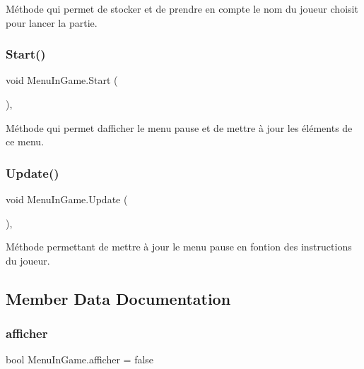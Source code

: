 Méthode qui permet de stocker et de prendre en compte le nom du joueur choisit pour lancer la partie. \mbox{\label{class_menu_in_game_a1dca3c194244a6dde3cbc99df42a819c}} 
\subsubsection{\texorpdfstring{Start()}{Start()}}
{\footnotesize\ttfamily void Menu\+In\+Game.\+Start (\begin{DoxyParamCaption}{ }\end{DoxyParamCaption})\hspace{0.3cm}{\ttfamily [inline]}, {\ttfamily [private]}}

Méthode qui permet d\textquotesingle{}afficher le menu pause et de mettre à jour les éléments de ce menu. \mbox{\label{class_menu_in_game_a47696469d25023de3d2e4d4098c4af12}} 
\subsubsection{\texorpdfstring{Update()}{Update()}}
{\footnotesize\ttfamily void Menu\+In\+Game.\+Update (\begin{DoxyParamCaption}{ }\end{DoxyParamCaption})\hspace{0.3cm}{\ttfamily [inline]}, {\ttfamily [private]}}

Méthode permettant de mettre à jour le menu pause en fontion des instructions du joueur. 

\subsection{Member Data Documentation}
\mbox{\label{class_menu_in_game_af5a87c978112f565b6accf24dfc5c99d}} 
\subsubsection{\texorpdfstring{afficher}{afficher}}
{\footnotesize\ttfamily bool Menu\+In\+Game.\+afficher = false\hspace{0.3cm}{\ttfamily [static]}}

